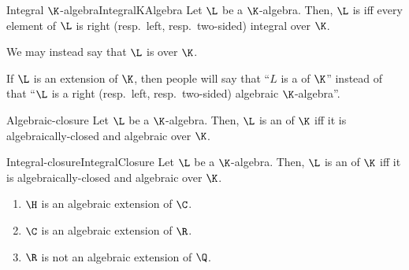 \begin{dfn}{Integral $\K$-algebra}{IntegralKAlgebra}
	Let $\L$ be a $\K$-algebra.  Then, $\L$ is  iff every element of $\L$ is right (resp.~left, resp.~two-sided) integral over $\K$.
	\begin{rmk}
		We may instead say that $\L$ is  over $\K$.
	\end{rmk}
	\begin{rmk}
		If $\L$ is an extension of $\K$, then people will say that ``$L$ is a  of $\K$'' instead of that ``$\L$ is a right (resp.~left, resp.~two-sided) algebraic $\K$-algebra''.
	\end{rmk}
\end{dfn}
\begin{dfn}{Algebraic-closure}{}
	Let $\L$ be a $\K$-algebra.  Then, $\L$ is an  of $\K$ iff it is algebraically-closed and algebraic over $\K$.
\end{dfn}
\begin{dfn}{Integral-closure}{IntegralClosure}
	Let $\L$ be a $\K$-algebra.  Then, $\L$ is an  of $\K$ iff it is algebraically-closed and algebraic over $\K$.
\end{dfn}
\begin{exm}{}{}
	\begin{enumerate}
		\item $\H$ is an algebraic extension of $\C$.
		\item $\C$ is an algebraic extension of $\R$.
		\item $\R$ is not an algebraic extension of $\Q$.
	\end{enumerate}
\end{exm}
